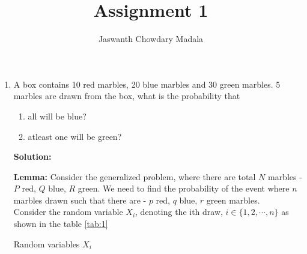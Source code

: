 \documentclass[journal,12pt,twocolumn]{IEEEtran}
\begin{document}
\vspace{3cm}


\title{Assignment 1}
\author{Jaswanth Chowdary Madala}





\maketitle

\newpage


\bigskip

\renewcommand{\thefigure}{\theenumi}
\renewcommand{\thetable}{\theenumi}



\begin{enumerate}
\item A box contains 10 red marbles, 20 blue marbles and 30 green marbles. 5 marbles
are drawn from the box, what is the probability that
\begin{enumerate}
\item all will be blue?
\item atleast one will be green?
\end{enumerate}
\textbf{Solution:}

\textbf{Lemma:}
Consider the generalized problem, where there are total $N$ marbles - $P$ red, $Q$ blue, $R$ green. We need to find the probability of the event where $n$ marbles drawn such that there are - $p$ red, $q$ blue, $r$ green marbles.\\

Consider the random variable $X_i$, denoting the ith draw, $i \in \{1,2,\cdots, n\}$ as shown in the table \ref{tab:1}
\begin{table}[h]
\centering

\caption{Random variables $X_i$}
\label{tab:1}
\end{table}


\end{enumerate}
\end{document}
